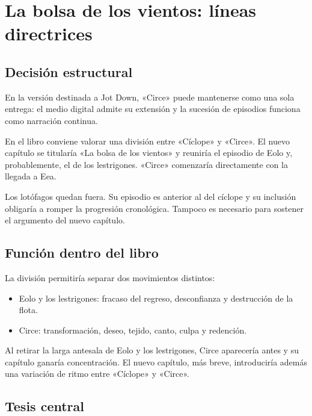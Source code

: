 
\section*{La bolsa de los vientos: líneas directrices}

\subsection*{Decisión estructural}

En la versión destinada a Jot Down, «Circe» puede mantenerse como una sola
entrega: el medio digital admite su extensión y la sucesión de episodios
funciona como narración continua.

En el libro conviene valorar una división entre «Cíclope» y «Circe». El nuevo
capítulo se titularía «La bolsa de los vientos» y reuniría el episodio de Eolo
y, probablemente, el de los lestrigones. «Circe» comenzaría directamente con
la llegada a Eea.

Los lotófagos quedan fuera. Su episodio es anterior al del cíclope y su
inclusión obligaría a romper la progresión cronológica. Tampoco es necesario
para sostener el argumento del nuevo capítulo.

\subsection*{Función dentro del libro}

La división permitiría separar dos movimientos distintos:

\begin{itemize}
\item Eolo y los lestrigones: fracaso del regreso, desconfianza y destrucción
      de la flota.
\item Circe: transformación, deseo, tejido, canto, culpa y redención.
\end{itemize}

Al retirar la larga antesala de Eolo y los lestrigones, Circe aparecería antes
y su capítulo ganaría concentración. El nuevo capítulo, más breve, introduciría
además una variación de ritmo entre «Cíclope» y «Circe».

\subsection*{Tesis central}

